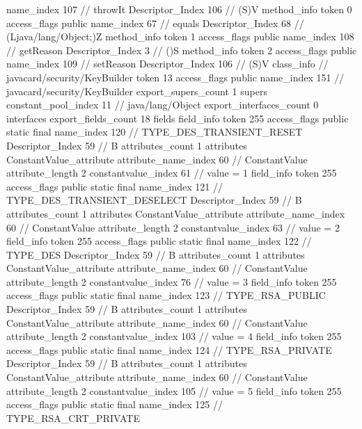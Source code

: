 {{{{{					name_index	107		// throwIt
					Descriptor_Index	106		// (S)V
				}
				method_info {
					token	0
					access_flags	public
					name_index	67		// equals
					Descriptor_Index	68		// (Ljava/lang/Object;)Z
				}
				method_info {
					token	1
					access_flags	public
					name_index	108		// getReason
					Descriptor_Index	3		// ()S
				}
				method_info {
					token	2
					access_flags	public
					name_index	109		// setReason
					Descriptor_Index	106		// (S)V
				}
			}
		}
		class_info {		// javacard/security/KeyBuilder
			token	13
			access_flags	public
			name_index	151		// javacard/security/KeyBuilder
			export_supers_count	1
			supers {
				constant_pool_index	11		// java/lang/Object
			}
			export_interfaces_count	0
			interfaces {
			}
			export_fields_count	18
			fields {
			field_info {
				token	255
				access_flags	public static final
				name_index	120		// TYPE_DES_TRANSIENT_RESET
				Descriptor_Index	59		// B
				attributes_count	1
				attributes {
				ConstantValue_attribute {
					attribute_name_index	60		// ConstantValue
					attribute_length	2
					constantvalue_index	61		// value = 1
				}
				}
			}
			field_info {
				token	255
				access_flags	public static final
				name_index	121		// TYPE_DES_TRANSIENT_DESELECT
				Descriptor_Index	59		// B
				attributes_count	1
				attributes {
				ConstantValue_attribute {
					attribute_name_index	60		// ConstantValue
					attribute_length	2
					constantvalue_index	63		// value = 2
				}
				}
			}
			field_info {
				token	255
				access_flags	public static final
				name_index	122		// TYPE_DES
				Descriptor_Index	59		// B
				attributes_count	1
				attributes {
				ConstantValue_attribute {
					attribute_name_index	60		// ConstantValue
					attribute_length	2
					constantvalue_index	76		// value = 3
				}
				}
			}
			field_info {
				token	255
				access_flags	public static final
				name_index	123		// TYPE_RSA_PUBLIC
				Descriptor_Index	59		// B
				attributes_count	1
				attributes {
				ConstantValue_attribute {
					attribute_name_index	60		// ConstantValue
					attribute_length	2
					constantvalue_index	103		// value = 4
				}
				}
			}
			field_info {
				token	255
				access_flags	public static final
				name_index	124		// TYPE_RSA_PRIVATE
				Descriptor_Index	59		// B
				attributes_count	1
				attributes {
				ConstantValue_attribute {
					attribute_name_index	60		// ConstantValue
					attribute_length	2
					constantvalue_index	105		// value = 5
				}
				}
			}
			field_info {
				token	255
				access_flags	public static final
				name_index	125		// TYPE_RSA_CRT_PRIVATE
}}}}}
